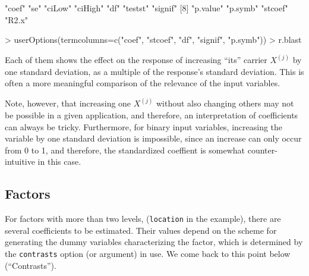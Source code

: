 \documentclass[11pt]{article}
\providecommand{\T}{\texttt}
\begin{document}
\begin{Schunk}
\begin{Soutput}
 [1] "coef"    "se"      "ciLow"   "ciHigh"  "df"      "testst"  "signif" 
 [8] "p.value" "p.symb"  "stcoef"  "R2.x"   
\end{Soutput}
\begin{Sinput}
> userOptions(termcolumns=c("coef", "stcoef", "df", "signif", "p.symb"))
> r.blast
\end{Sinput}
\end{Schunk}
Each of them shows the effect on the response of increasing ``its'' 
carrier $X^{(j)}$ by one standard deviation, as a multiple 
of the response's standard deviation. 
This is often a more meaningful comparison of the relevance of the input
variables. 

Note, however, that increasing one $X^{(j)}$ without also changing
others may not be possible in a given application, and therefore, 
an interpretation of coefficients can always be tricky.
Furthermore, for binary input variables, increasing the variable by one
standard deviation is impossible, since an increase can only occur from 0
to 1, and therefore, the standardized coeffient is somewhat 
counter-intuitive in this case.

\subsection{Factors}
For factors with more than two levels, (\T{location} in the example), there
are several coefficients to be estimated. 
Their values depend on the scheme for generating the 
dummy variables characterizing the factor, which is determined 
by the \T{contrasts} option (or argument) in use.
We come back to this point below (``Contrasts'').
\end{document}
